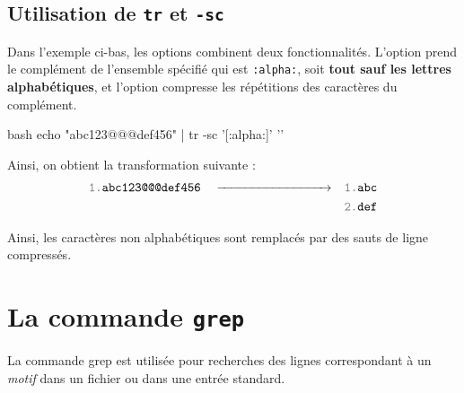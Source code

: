 \documentclass[a4paper, 14pt]{report}
\begin{document}
    \subsection{Utilisation de \texttt{tr} et \texttt{-sc}}
    \begin{Exemple}
        Dans l'exemple 
        ci-bas, les options \noindent{} 
        combinent deux fonctionnalités.
        L'option  
        prend le complément de l’ensemble spécifié qui est 
        \texttt{:alpha:}, soit
        \textbf{tout sauf les lettres alphabétiques}, et
        l'option
        \noindent{}  
        compresse les répétitions
        des caractères du complément. 
        \begin{center}
        \begin{minipage}{0.5\linewidth}
            \begin{cminted}{bash}
echo "abc123@@@def456" | tr -sc '[:alpha:]' '\n'
            \end{cminted}
        \end{minipage}
        \end{center}


        \vspace{0.5em}

        \noindent 
        Ainsi, on obtient la transformation suivante :
        \begin{align*}
            \textcolor{gray}{\texttt{1.}}  \texttt{abc123@@@def456} \quad \xrightarrow{\hspace*{3cm}} \quad &\textcolor{gray}{\texttt{1.}} \texttt{abc}
            \\
                                                 &\textcolor{gray}{\texttt{2.}} \texttt{def}
        \end{align*}

        Ainsi, les caractères non alphabétiques sont remplacés par des
        sauts de ligne compressés.
        \hfill\\
    \end{Exemple}

    \section{La commande \texttt{grep}}
    \begin{Concept}
        La commande grep est utilisée pour recherches des lignes correspondant 
        à un \textit{motif}  dans un fichier ou dans une entrée standard. 
    \end{Concept}
    \vspace{1em}
\end{document}
